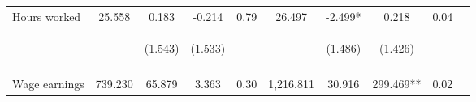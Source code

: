 \begin{tabular}{lccccccccc}
\noalign{\smallskip}Hours worked & 25.558 & 0.183 & -0.214 & 0.79 & 26.497 & -2.499* & 0.218 & 0.04 & \\
 & \begin{footnotesize}\end{footnotesize} & \begin{footnotesize}(1.543)\end{footnotesize} & \begin{footnotesize}(1.533)\end{footnotesize} & \begin{footnotesize}\end{footnotesize} & \begin{footnotesize}\end{footnotesize} & \begin{footnotesize}(1.486)\end{footnotesize} & \begin{footnotesize}(1.426)\end{footnotesize} & \begin{footnotesize}\end{footnotesize} & \begin{footnotesize}\end{footnotesize}\\
 & \begin{footnotesize}\end{footnotesize} & \begin{footnotesize}[0.837]\end{footnotesize} & \begin{footnotesize}[1.000]\end{footnotesize} & \begin{footnotesize}\end{footnotesize} & \begin{footnotesize}\end{footnotesize} & \begin{footnotesize}[0.411]\end{footnotesize} & \begin{footnotesize}[1.000]\end{footnotesize} & \begin{footnotesize}\end{footnotesize} & \begin{footnotesize}\end{footnotesize}\\
\noalign{\smallskip}Wage earnings & 739.230 & 65.879 & 3.363 & 0.30 & 1,216.811 & 30.916 & 299.469** & 0.02 & \\

\end{tabular}
